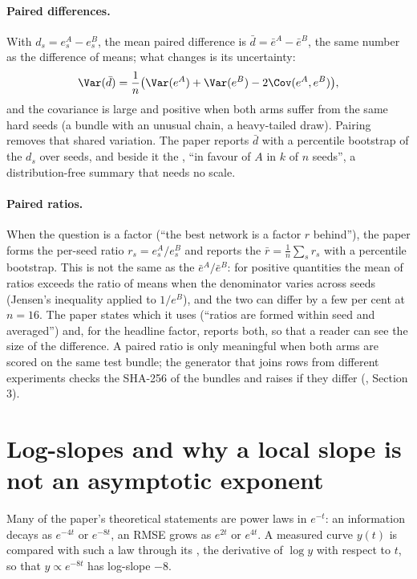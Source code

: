 \paragraph{Paired differences.}
With $d_s=e^A_s-e^B_s$, the mean paired difference is $\bar d=\bar e^A-\bar e^B$, the
same number as the difference of means; what changes is its uncertainty:
\begin{equation}
  \Var(\bar d)=\frac1n\bigl(\Var(e^A)+\Var(e^B)-2\Cov(e^A,e^B)\bigr),
\end{equation}
and the covariance is large and positive when both arms suffer from the same hard
seeds (a bundle with an unusual chain, a heavy-tailed draw). Pairing removes that
shared variation. The paper reports $\bar d$ with a percentile bootstrap of the $d_s$
over seeds, and beside it the , ``in favour of $A$ in $k$ of $n$
seeds'', a distribution-free summary that needs no scale.

\paragraph{Paired ratios.}
When the question is a factor (``the best network is a factor $r$ behind''), the paper
forms the per-seed ratio $r_s=e^A_s/e^B_s$ and reports the 
$\bar r=\tfrac1n\sum_sr_s$ with a percentile bootstrap. This is not the same as the
 $\bar e^A/\bar e^B$: for positive quantities the mean of ratios
exceeds the ratio of means when the denominator varies across seeds (Jensen's
inequality applied to $1/e^B$), and the two can differ by a few per cent at $n=16$.
The paper states which it uses (``ratios are formed within seed and averaged'') and,
for the headline factor, reports both, so that a reader can see the size of the
difference. A paired ratio is only meaningful when both arms are scored on the same
test bundle; the generator that joins rows from different experiments checks the
SHA-256 of the bundles and raises if they differ (,
Section 3).

\section{Log-slopes and why a local slope is not an asymptotic exponent}
\label{sec:slopes}

Many of the paper's theoretical statements are power laws in $e^{-t}$: an information
decays as $e^{-4t}$ or $e^{-8t}$, an RMSE grows as $e^{2t}$ or $e^{4t}$. A measured curve
$y(t)$ is compared with such a law through its , the derivative of
$\log y$ with respect to $t$, so that $y\propto e^{-8t}$ has log-slope $-8$.

